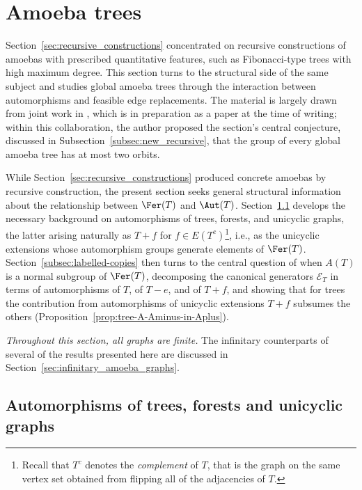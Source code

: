 
\section{Amoeba trees}\label{sec:amoeba_trees}

Section~\ref{sec:recursive_constructions} concentrated on recursive constructions of amoebas with prescribed quantitative features, such as Fibonacci-type trees with high maximum degree.
This section turns to the structural side of the same subject and studies global amoeba trees through the interaction between automorphisms and feasible edge replacements.
The material is largely drawn from joint work in \cite{GomezetalPreprint}, which is in preparation as a paper at the time of writing; within this collaboration, the author proposed the section's central conjecture, discussed in Subsection~\ref{subsec:new_recursive}, that the \tFer group of every global amoeba tree has at most two orbits.

While Section~\ref{sec:recursive_constructions} produced concrete amoebas by recursive construction, the present section seeks general structural information about the relationship between $\Fer(T)$ and $\Aut(T)$.
Section~\ref{subsec:aut-trees-forests-unicyclic} develops the necessary background on automorphisms of trees, forests, and unicyclic graphs, the latter arising naturally as $T+f$ for $f\in E(T^c)$\footnote{Recall that $T^c$ denotes the \emph{complement} of $T$, that is the graph on the same vertex set obtained from flipping all of the adjacencies of $T$.}, i.e., as the unicyclic extensions whose automorphism groups generate elements of $\Fer(T)$.
Section~\ref{subsec:labelled-copies} then turns to the central question of when $A(T)$ is a normal subgroup of $\Fer(T)$, decomposing the canonical generators $\mathcal E_T$ in terms of automorphisms of $T$, of $T-e$, and of $T+f$, and showing that for trees the contribution from automorphisms of unicyclic extensions $T+f$ subsumes the others (Proposition~\ref{prop:tree-A-Aminus-in-Aplus}).

\emph{Throughout this section, all graphs are finite.}
The infinitary counterparts of several of the results presented here are discussed in Section~\ref{sec:infinitary_amoeba_graphs}.

\subsection{Automorphisms of trees, forests and unicyclic graphs}\label{subsec:aut-trees-forests-unicyclic}

